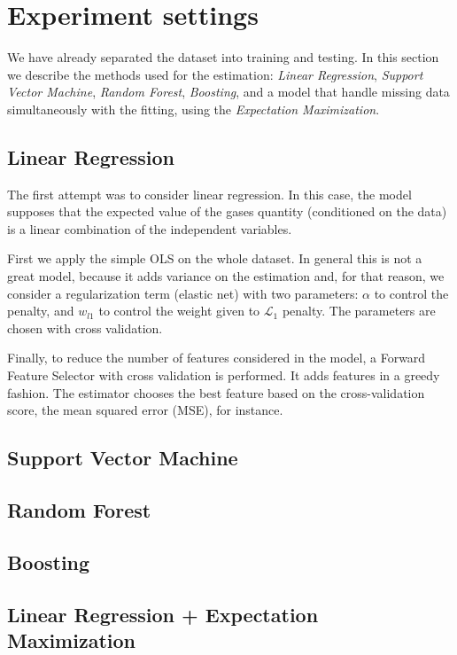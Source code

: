 \section{Experiment settings}
\label{sec:experiments}

We have already separated the dataset into training and testing. In this
section we describe the methods used for the estimation: {\em Linear
Regression}, {\em Support Vector Machine}, {\em Random Forest}, {\em
Boosting}, and a model that handle missing data simultaneously with the
fitting, using the {\em Expectation Maximization}.

\subsection{Linear Regression}

The first attempt was to consider linear regression. In this case, the model
supposes that the expected value of the gases quantity (conditioned on the
data) is a linear combination of the independent variables. 

First we apply the simple OLS on the whole dataset. In general this is not a
great model, because it adds variance on the estimation and, for that reason, we consider a regularization term (elastic
net) with two parameters: $\alpha$ to control the penalty, and $w_{l1}$ to
control the weight given to $\mathcal{L}_1$ penalty. The parameters are chosen
with cross validation. 

Finally, to reduce the number of features considered in the model, a
Forward Feature Selector with cross validation is performed. It adds features
in a greedy fashion. The estimator chooses the best feature based on the
cross-validation score, the mean squared error (MSE), for instance. 

\subsection{Support Vector Machine}

\subsection{Random Forest}

\subsection{Boosting}

\subsection{Linear Regression + Expectation Maximization}